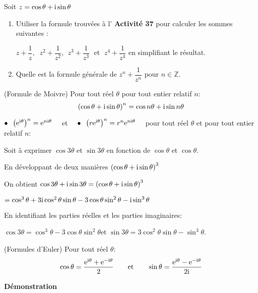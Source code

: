 \begin{lemma}

Soit $ z=\cos \theta +\text{i} \sin \theta $
\begin{enumerate}
\item Utiliser la formule trouvées à l'
\textbf{Activité 37}  pour calculer  les sommes suivantes :

\medskip

$ z+ \dfrac{1}{z}, \;\;  z^2 + \dfrac{1}{z^2}$, $ \;z^3+ \dfrac{1}{z^3} \; $  et   $ \; z^4 + \dfrac{1}{z^4}$ en simplifiant le résultat.
\item Quelle est la  formule générale de $ z^n + \dfrac{1}{z^n} $ pour $ n\in\mathbb{Z} $.

\end{enumerate}
\end{lemma}
\begin{property}{(Formule de Moivre)} 
Pour tout réel $ \theta $   pour tout entier relatif $ n $:
\[\left(\cos \theta +\text{i} \sin \theta\right)^n=\cos n\theta +\text{i} \sin n\theta\]
\end{property}
\begin{corollary}
 $ \bullet\; \;\left(\mathrm{e}^{\text{i}\theta}\right)^n =\mathrm{e}^{n\text{i}\theta}\quad$  et   $\quad \bullet\; \; \left(r\mathrm{e}^{\text{i}\theta}\right)^n =r^n\mathrm{e}^{n\text{i}\theta}\quad $ pour tout réel $ \theta $  et pour tout entier relatif $ n $:
  \end{corollary}
\begin{example}
Soit à exprimer $ \cos 3\theta $   et $ \sin 3\theta $  en fonction de $ \cos \theta $  et $ \cos \theta $.

\medskip
En développant de deux manières  $ \left(\cos \theta +\text{i}\sin  \theta\right)^3 $

\medskip
On obtient  \;  $ \cos 3\theta +\text{i}\sin 3 \theta=\left(\cos \theta +\text{i}\sin  \theta\right)^3$


\medskip
 $ = \cos^3\theta+ 3\text{i}\cos^2\theta\sin\theta-3\cos\theta\sin^2\theta -\text{i} \sin^3\theta $

\medskip
En identifiant les parties réelles et les parties imaginaires:


\medskip
$ \cos3\theta=\cos^3\theta-3\cos\theta\sin^2\theta  $\quad et \quad $ \sin 3 \theta=3\cos^2\theta\sin\theta-\sin^3\theta $.
\end{example}
\begin{property}{(Formules d'Euler)}
Pour tout réel $ \theta $:
\[\cos \theta = \dfrac{\mathrm{e}^{\text{i}\theta}+\mathrm{e}^{-\text{i}\theta}}{2}  \qquad \text{et}\qquad\sin\theta = \dfrac{\mathrm{e}^{\text{i}\theta}-\mathrm{e}^{-\text{i}\theta}}{2\text{i}}\]
\end{property}
\textbf{Démonstration}

